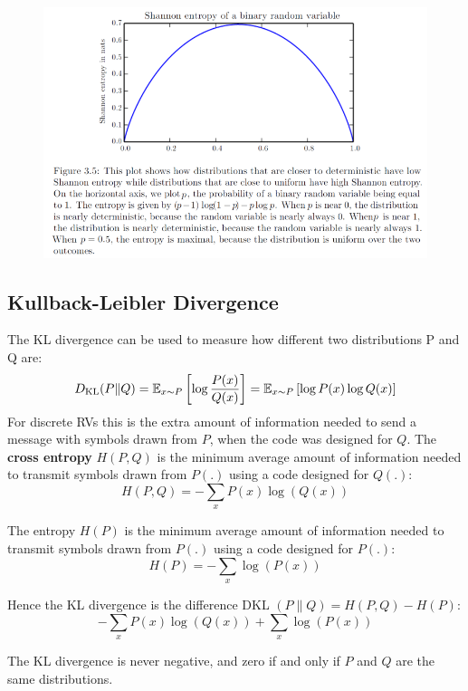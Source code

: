 \begin{multicols}{2}
	\begin{figure}[H]
		\centering
		\includegraphics[width=1\linewidth]{images/shannon.png}
	\end{figure}

	\subsection{Kullback-Leibler Divergence}
	The KL divergence can be used to measure how different two distributions P and Q are:
	\[ D_{\text{KL}}(P\lVert Q) = \mathbb{E}_{x\sim P}\left[\log \frac{P(x)}{Q(x)}\right]=
	\mathbb{E}_{x\sim P}\left[\log {P(x)} \log {Q(x)}\right]
	 \]
	For discrete RVs this is the extra amount of information needed to send a message with symbols drawn from $P$, when the code was designed for $Q$.
	The \textbf{cross entropy} $H(P,Q)$ is the minimum average amount of information needed to transmit symbols drawn from $P(.)$ using a code designed for $Q(.)$:
	\[ H(P,Q) = -\sum_{x} P(x)\log \left(Q(x)\right) \]
	
	The entropy $H(P)$ is the minimum average amount of information needed to transmit symbols drawn from $P(.)$ using a code designed for $P(.)$:
	\[ H(P) = -\sum_{x} \log\left(P(x)\right) \]
	
	Hence the KL divergence is the difference DKL $(P\lVert Q)=H(P,Q)-H(P)$:
	\[ -\sum_{x} P(x)\log \left(Q(x)\right) +\sum_{x} \log\left(P(x)\right) \]
	
	The KL divergence is never negative, and zero if and only if $P$ and $Q$ are the same distributions.
	
\end{multicols}
\newpage













